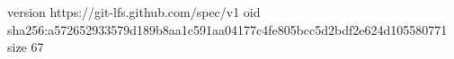 version https://git-lfs.github.com/spec/v1
oid sha256:a572652933579d189b8aa1c591aa04177c4fe805bcc5d2bdf2e624d105580771
size 67
